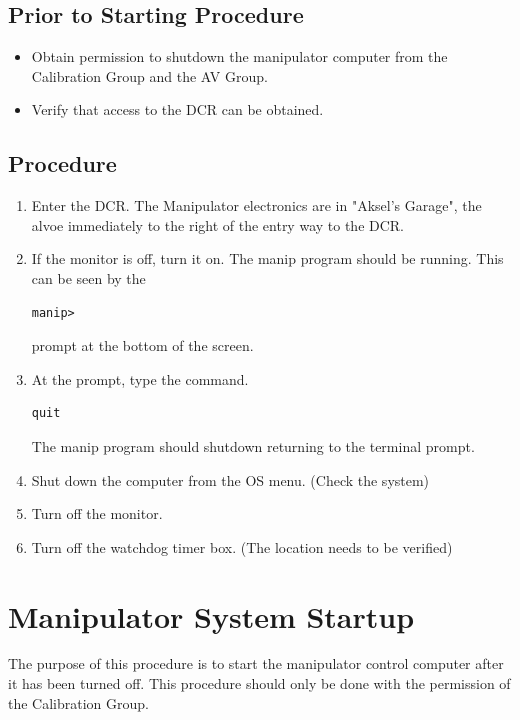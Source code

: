 \documentclass[11pt]{article}
\begin{document}
\subsection{Prior to Starting Procedure}
\begin{itemize}
\item Obtain permission to shutdown the manipulator computer from the Calibration Group and the AV Group.
\item Verify that access to the DCR can be obtained.
\end{itemize}

\subsection{Procedure}
\begin{enumerate}
\item \CheckBox[name=p1]{} Enter the DCR. The Manipulator electronics are in "Aksel's Garage", the alvoe immediately to the right of the entry way to the DCR.
\item \CheckBox[name=p2]{} If the monitor is off, turn it on. The manip program should be running. This can be seen by the 
\begin{verbatim}
manip>
\end{verbatim}
prompt at the bottom of the screen.
\item \CheckBox[name=p3]{} At the prompt, type the command.
\begin{verbatim}
quit
\end{verbatim}
The manip program should shutdown returning to the terminal prompt.
\item \CheckBox[name=p4]{} Shut down the computer from the OS menu. (Check the system)
\item \CheckBox[name=p5]{} Turn off the monitor.
\item \CheckBox[name=p6]{} Turn off the watchdog timer box. (The location needs to be verified)
\end{enumerate}
\section{Manipulator System Startup}

The purpose of this procedure is to start the manipulator control computer after it has been turned off. This procedure should only be done with the permission of the Calibration Group.
\end{document}
